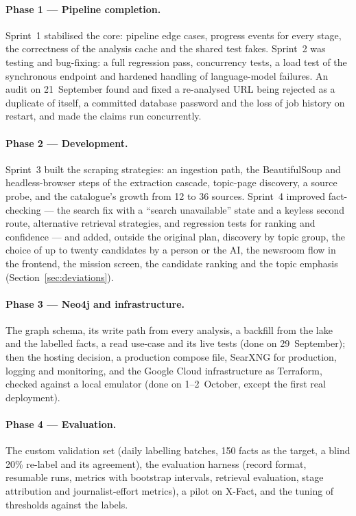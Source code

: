 \paragraph{Phase 1 --- Pipeline completion.} Sprint~1 stabilised the
core: pipeline edge cases, progress events for every stage, the
correctness of the analysis cache and the shared test fakes. Sprint~2
was testing and bug-fixing: a full regression pass, concurrency tests,
a load test of the synchronous endpoint and hardened handling of
language-model failures. An audit on 21~September found and fixed a
re-analysed URL being rejected as a duplicate of itself, a committed
database password and the loss of job history on restart, and made the
claims run concurrently.

\paragraph{Phase 2 --- Development.} Sprint~3 built the scraping
strategies: an ingestion path, the BeautifulSoup and headless-browser
steps of the extraction cascade, topic-page discovery, a source probe,
and the catalogue's growth from 12 to 36 sources. Sprint~4 improved
fact-checking --- the search fix with a ``search unavailable'' state
and a keyless second route, alternative retrieval strategies, and
regression tests for ranking and confidence --- and added, outside the
original plan, discovery by topic group, the choice of up to twenty
candidates by a person or the AI, the newsroom flow in the frontend,
the mission screen, the candidate ranking and the topic emphasis
(Section~\ref{sec:deviations}).

\paragraph{Phase 3 --- Neo4j and infrastructure.} The graph schema, its
write path from every analysis, a backfill from the lake and the
labelled facts, a read use-case and its live tests (done on
29~September); then the hosting decision, a production compose file,
SearXNG for production, logging and monitoring, and the Google Cloud
infrastructure as Terraform, checked against a local emulator (done on
1--2~October, except the first real deployment).

\paragraph{Phase 4 --- Evaluation.} The custom validation set (daily
labelling batches, 150 facts as the target, a blind 20\% re-label and
its agreement), the evaluation harness (record format, resumable runs,
metrics with bootstrap intervals, retrieval evaluation, stage
attribution and journalist-effort metrics), a pilot on X-Fact, and the
tuning of thresholds against the labels.

